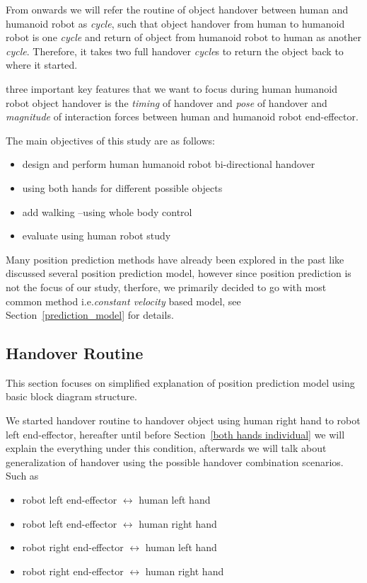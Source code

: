 \documentclass[a4paper, 12pt, oneside]{Thesis}  %
\begin{document}
From onwards we will refer the routine of object handover between human and humanoid robot as \textit{cycle}, such that object handover from human to humanoid robot is one \textit{cycle} and return of object from humanoid robot to human as another \textit {cycle}. Therefore, it takes two full handover \textit{cycle}s to return the object back to where it started.

three important key features that we want to focus during human humanoid robot object handover is the \textit{timing} of handover and \textit{pose} of handover and \textit{magnitude} of interaction forces between human and humanoid robot end-effector.

The main objectives of this study are as follows:
                                  
\begin{itemize}
	\item design and perform human humanoid robot bi-directional handover
	 
	\item using both hands for different possible objects
	
	\item add walking --using whole body control
	
	\item evaluate using human robot study
\end{itemize}


Many position prediction methods have already been explored in the past like~\cite{li2015predicting} discussed several position prediction model, however since position prediction is not the focus of our study, therfore, we primarily decided to go with most common method i.e.\textit{constant velocity} based model, see Section~\ref{prediction_model} for details.


\subsection{Handover Routine}\label{handover routine}
This section focuses on simplified explanation of position prediction model using basic block diagram structure.

We started handover routine to handover object using human right hand to robot left end-effector, hereafter until before Section~\ref{both hands individual} we will explain the everything under this condition, afterwards we will talk about generalization of handover using the possible handover combination scenarios. Such as 
\begin{itemize}
    \item robot left end-effector $\longleftrightarrow$ human left hand
    \item robot left end-effector $\longleftrightarrow$ human right hand
    \item robot right end-effector $\longleftrightarrow$ human left hand
    \item robot right end-effector $\longleftrightarrow$ human right hand
\end{itemize}
\end{document}
